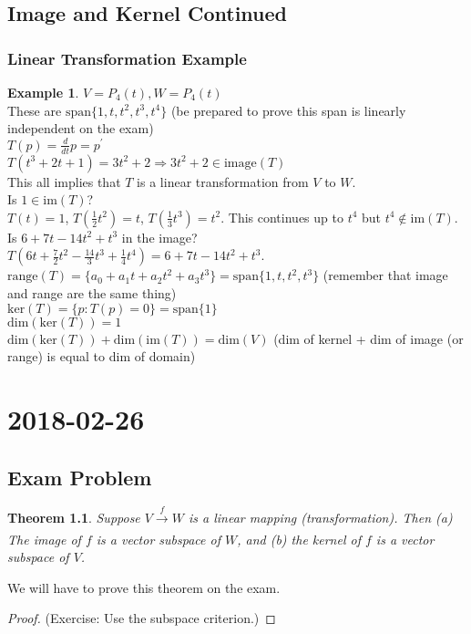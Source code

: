 \documentclass{report}
\theoremstyle{plain}
\newtheorem*{thrm}{Theorem}
\theoremstyle{definition}
\newtheorem*{ex}{Example}
\theoremstyle{plain}
\newcommand{\mychapter}[2]{
	\setcounter{chapter}{#1}
	\setcounter{section}{0}
	\chapter*{#2}
	\addcontentsline{toc}{chapter}{#2}
}
\begin{document}
\section{Image and Kernel Continued}
\subsection{Linear Transformation Example}
\begin{ex}
$V=P_4(t), W=P_4(t)$\\
These are $\mathrm{span}\{1,t,t^2,t^3,t^4\}$ (be prepared to prove this span is linearly independent on the exam)\\
$T(p) = \frac{d}{dt}p=p^\prime$\\
$T(t^3+2t+1)=3t^2+2 \Rightarrow 3t^2+2 \in \mathrm{image}(T)$\\
This all implies that $T$ is a linear transformation from $V$ to $W$.\\
Is $1 \in \mathrm{im}(T)$?\\
$T(t)=1$, $T(\frac{1}{2}t^2) = t$, $T(\frac{1}{3}t^3) = t^2$. This continues up to $t^4$ but $t^4 \not\in \mathrm{im}(T)$.\\
Is $6+7t-14t^2+t^3$ in the image?\\
$T(6t+\frac{7}{2}t^2-\frac{14}{3}t^3+\frac{1}{4}t^4) = 6+7t-14t^2+t^3$.\\
$\mathrm{range}(T)=\{a_0+a_1t+a_2t^2+a_3t^3\} = \mathrm{span}\{1,t,t^2,t^3\}$ (remember that image and range are the same thing)\\
$\mathrm{ker}(T)=\{p: T(p) = 0\} = \mathrm{span}\{1\}$\\
$\mathrm{dim}(\mathrm{ker}(T))=1$\\
$\mathrm{dim}(\mathrm{ker}(T)) + \mathrm{dim}(\mathrm{im}(T)) = \mathrm{dim}(V)$ (dim of kernel + dim of image (or range) is equal to dim of domain)
\end{ex}


\mychapter{21}{2018-02-26}
\section{Exam Problem}
\begin{thrm}
Suppose $V\xrightarrow[]{f} W$ is a linear mapping (transformation). Then (a) The image of $f$ is a vector subspace of $W$, and (b) the kernel of $f$ is a vector subspace of $V$.
\end{thrm}
We will have to prove this theorem on the exam.
\begin{proof}
(Exercise: Use the subspace criterion.)
\end{proof}
\end{document}
